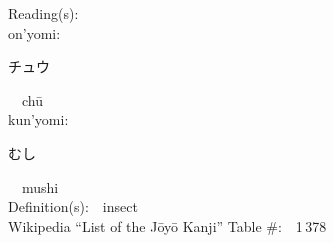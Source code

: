 \begin{multicols}{2}
Reading(s):\ \ \\
{\hspace*{1em}}on'yomi:\ \ \\
{\hspace*{2em}}{\begin{CJK}{UTF8}{min} チュウ \end{CJK}}\ \ ch\=u\ \ \\
{\hspace*{1em}}kun'yomi:\ \ \\
{\hspace*{2em}}{\begin{CJK}{UTF8}{min} むし \end{CJK}}\ \ mushi\ \ \\
Definition(s):\ \ insect \\
Wikipedia ``List of the J\=oy\=o Kanji'' Table \#:\ \ 1\,378 \\
\ \ \\
\end{multicols}



